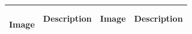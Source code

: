 \documentclass{standalone}
\makeatletter
\newcommand{\specialcell}[2][b]{\begin{tabular}[#1]{@{}c@{}}#2\end{tabular}}
\makeatother
\begin{document}
	
	\begin{tabular}{|c|C{18em}|c|C{18em}|}
		\hline
		\specialcell{\\[-8pt] \textbf{{\large Image}}} & \textbf{{\large Description}} & \textbf{{\large Image}} & \textbf{{\large Description}}\\ [0.5ex]
		\hline

\end{tabular}
\end{document}
